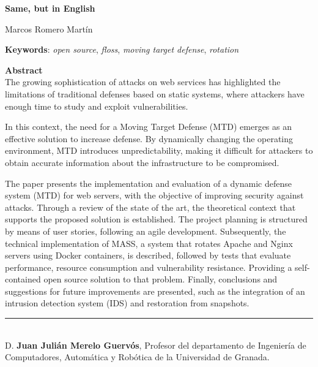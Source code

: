 \cleardoublepage

\begin{center}
	{\large\bfseries Same, but in English}\\
\end{center}
\begin{center}
	Marcos Romero Martín\\
\end{center}
\vspace{0.5cm}
\noindent\textbf{Keywords}: \textit{open source}, \textit{floss}, \textit{moving target defense},  \textit{rotation}
\vspace{0.7cm}

\noindent\textbf{Abstract}\\
The growing sophistication of attacks on web services has highlighted the limitations of traditional defenses based on static systems, where attackers have enough time to study and exploit vulnerabilities.

In this context, the need for a Moving Target Defense (MTD) emerges as an effective solution to increase defense. By dynamically changing the operating environment, MTD introduces unpredictability, making it difficult for attackers to obtain accurate information about the infrastructure to be compromised.

The paper presents the implementation and evaluation of a dynamic defense system (MTD) for web servers, with the objective of improving security against attacks. Through a review of the state of the art, the theoretical context that supports the proposed solution is established. The project planning is structured by means of user stories, following an agile development. Subsequently, the technical implementation of MASS, a system that rotates Apache and Nginx servers using Docker containers, is described, followed by tests that evaluate performance, resource consumption and vulnerability resistance. Providing a self-contained open source solution to that problem. Finally, conclusions and suggestions for future improvements are presented, such as the integration of an intrusion detection system (IDS) and restoration from snapshots.

\cleardoublepage

\thispagestyle{empty}

\noindent\rule[-1ex]{\textwidth}{2pt}\\[4.5ex]

D. \textbf{Juan Julián Merelo Guervós}, Profesor del departamento de Ingeniería de Computadores, Automática y Robótica de la Universidad de Granada.

